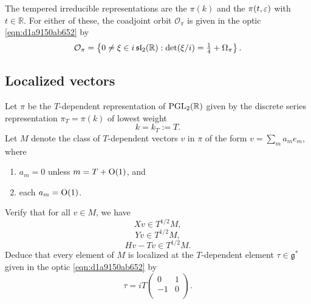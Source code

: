 \documentclass[reqno]{amsart} 
\numberwithin{equation}{section}
\begin{document}
The tempered irreducible representations are the $\pi(k)$ and the $\pi(t,\varepsilon)$ with $t \in \mathbb{R}$.  For either of these, the coadjoint orbit $\mathcal{O}_\pi$ is given in the optic \eqref{eqn:d1a9150ab652} by
\begin{equation}\label{eqn:d1a91628a316}
  \mathcal{O}_\pi = \left\{ 0 \neq \xi \in i \operatorname{\mathfrak{s}\mathfrak{l}}_2(\mathbb{R}) :
    \det(\xi/i) =   
\tfrac{1}{4} + \Omega_\pi     
  \right\}.
\end{equation}

\subsection{Localized vectors}\label{sec:d1a9162ea6e6}

\begin{exercise}
  Let $\pi$ be the $T$-dependent representation of $\operatorname{PGL}_2(\mathbb{R})$ given by the discrete series representation $\pi_T = \pi(k)$ of lowest weight
  \begin{equation*}
    k = k_T :=T.
  \end{equation*}
  Let $M$ denote the class of $T$-dependent vectors $v$ in $\pi$ of the form $v = \sum_m a_m e_m$, where
  \begin{enumerate}
  \item $a_m = 0$ unless $m = T + \operatorname{O}(1)$, and
  \item each $a_m = \operatorname{O}(1)$.
  \end{enumerate}
  Verify that for all $v \in M$, we have
  \begin{equation*}
X v \in T^{1/2} M,
\end{equation*}
\begin{equation*}
Y v \in T^{1/2} M,
\end{equation*}
\begin{equation*}
H v - T v \in T^{1/2} M.
\end{equation*}
Deduce that every element of $M$ is localized at the $T$-dependent element $\tau \in \mathfrak{g}^*$ given in the optic \eqref{eqn:d1a9150ab652} by
\begin{equation*}
  \tau =
  i T \begin{pmatrix}
0 & 1 \\
-1 & 0 \\
\end{pmatrix}.
\end{equation*}
\end{exercise}
\end{document}
